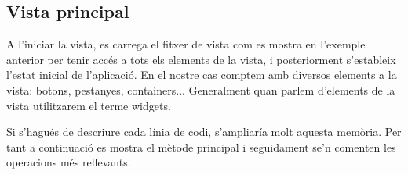 \documentclass[letterpaper,11pt,catalan]{sphinxmanual}
\begin{document}
\subsection{Vista principal}
\label{\detokenize{index:vista-principal}}
A l'iniciar la vista, es carrega el fitxer de vista com es mostra en l'exemple anterior
per tenir accés a tots els elements de la vista, i posteriorment s'estableix l'estat
inicial de l'aplicació. En el nostre cas comptem amb diversos elements a la vista: botons,
pestanyes, containers... Generalment quan parlem d'elements de la vista utilitzarem el terme
widgets.

Si s'hagués de descriure cada línia de codi, s'ampliaría molt aquesta memòria. Per tant a
continuació es mostra el mètode principal i seguidament se'n comenten les operacions
més rellevants.
\end{document}
